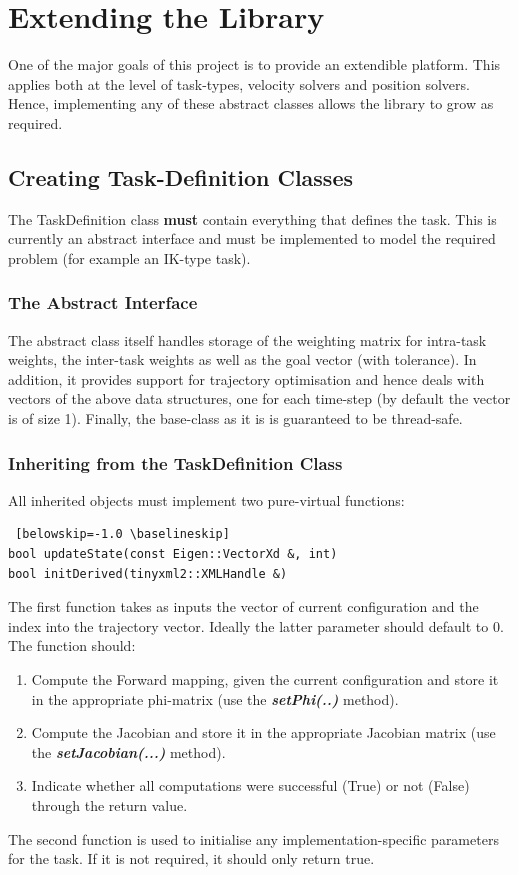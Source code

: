 \documentclass[12pt,a4paper,onecolumn]{article}
\begin{document}
\newpage
\section{Extending the Library}
\label{EXTENDING_THE_LIBRARY}
One of the major goals of this project is to provide an extendible platform. This applies both at the level of task-types, velocity solvers and position solvers. Hence, implementing any of these abstract classes allows the library to grow as required.

\subsection{Creating Task-Definition Classes}
The TaskDefinition class \textbf{must} contain everything that defines the task. This is currently an abstract interface and must be implemented to model the required problem (for example an IK-type task).
\subsubsection*{The Abstract Interface}
The abstract class itself handles storage of the weighting matrix for intra-task weights, the inter-task weights as well as the goal vector (with tolerance). In addition, it provides support for trajectory optimisation and hence deals with vectors of the above data structures, one for each time-step (by default the vector is of size 1).  Finally, the base-class as it is is guaranteed to be thread-safe.
\subsubsection*{Inheriting from the TaskDefinition Class}
All inherited objects must implement two pure-virtual functions:
\begin{lstlisting} [belowskip=-1.0 \baselineskip]
bool updateState(const Eigen::VectorXd &, int)
bool initDerived(tinyxml2::XMLHandle &)
\end{lstlisting}
The first function takes as inputs the vector of current configuration and the index into the trajectory vector. Ideally the latter parameter should default to 0. The function should:
\begin{enumerate}
\item Compute the Forward mapping, given the current configuration and store it in the appropriate phi-matrix (use the \textbf{\textit{setPhi(..)}} method).
\item Compute the Jacobian and store it in the appropriate Jacobian matrix (use the \textbf{\textit{setJacobian(...)}} method).
\item Indicate whether all computations were successful (True) or not (False) through the return value.
\end{enumerate}
The second function is used to initialise any implementation-specific parameters for the task. If it is not required, it should only return true.
\end{document}
